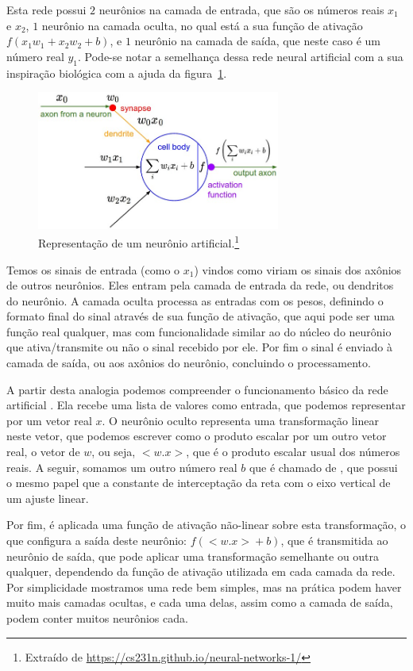 Esta rede possui $2$ neurônios na camada de entrada, que são os números reais $x_1$ e $x_2$, $1$ neurônio na camada oculta, no qual está a sua função de ativação $f(x_1w_1 + x_2w_2 + b)$, e $1$ neurônio na camada de saída, que neste caso é um número real $y_1$. Pode-se notar a semelhança dessa rede neural artificial com a sua inspiração biológica com a ajuda da figura~\ref{fig:neuron_model}. 

\begin{figure}[htb]
\centering
\includegraphics[width=8cm]{figuras/neuron_model}
\caption{Representação de um neurônio artificial.\footnote{Extraído de \url{https://cs231n.github.io/neural-networks-1/}}}
\label{fig:neuron_model}
\end{figure}

Temos os sinais de entrada (como o $x_1$) vindos como viriam os sinais dos axônios de outros neurônios. Eles entram pela camada de entrada da rede, ou dendritos do neurônio. A camada oculta processa as entradas com os pesos, definindo o formato final do sinal através de sua função de ativação, que aqui pode ser uma função real qualquer, mas com funcionalidade similar ao do núcleo do neurônio que ativa/transmite ou não o sinal recebido por ele. Por fim o sinal é enviado à camada de saída, ou aos axônios do neurônio, concluindo o processamento.

A partir desta analogia podemos compreender o funcionamento básico da rede artificial . Ela recebe uma lista de valores como entrada, que podemos representar por um vetor real $x$. O neurônio oculto representa uma transformação linear neste vetor, que podemos escrever como o produto escalar por um outro vetor real, o vetor de  $w$, ou seja, $<w.x>$, que é o produto escalar usual dos números reais. A seguir, somamos um outro número real $b$ que é chamado de , que possui o mesmo papel que a constante de interceptação da reta com o eixo vertical de um ajuste linear.

Por fim, é aplicada uma função de ativação não-linear sobre esta transformação, o que configura a saída deste neurônio: $f({<w.x>} + b)$, que é transmitida ao neurônio de saída, que pode aplicar uma transformação semelhante ou outra qualquer, dependendo da função de ativação utilizada em cada camada da rede. Por simplicidade mostramos uma rede bem simples, mas na prática podem haver muito mais camadas ocultas, e cada uma delas, assim como a camada de saída, podem conter muitos neurônios cada.

